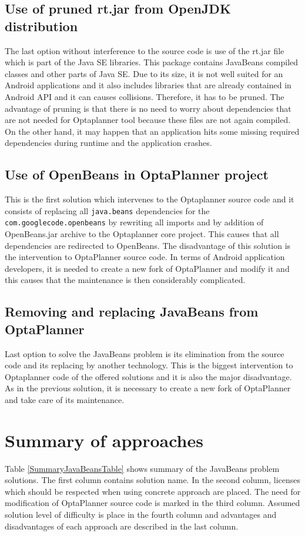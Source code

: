\subsection{Use of pruned rt.jar from OpenJDK distribution}\label{PrunedJarSection}
The last option without interference to the source code is use of the rt.jar file which is part of the Java SE
libraries. This package contains JavaBeans compiled classes and other parts of Java SE. Due to its size, it is not well
suited for an Android applications and it also includes libraries that are already contained in Android API and it can
causes collisions. Therefore, it has to be pruned. The advantage of pruning is that there is no need to worry about
dependencies that are not needed for Optaplanner tool because these files are not again compiled. On the other hand,
it may happen that an application hits some missing required dependencies during runtime and the application crashes.

\subsection{Use of OpenBeans in OptaPlanner project}\label{UseOpenBeansSection}
This is the first solution which intervenes to the Optaplanner source code and it consists of replacing all
\texttt{java.beans} dependencies for the \texttt{com.googlecode.openbeans} by rewriting all imports and by addition of
OpenBeans.jar archive to the Optaplanner core project. This causes that all dependencies are redirected to OpenBeans.
The disadvantage of this solution is the intervention to OptaPlanner source code. In terms of Android application
developers, it is needed to create a new fork of OptaPlanner and modify it and this causes that the maintenance is then
considerably complicated.

\subsection{Removing and replacing JavaBeans from OptaPlanner}\label{RemoveJavaBeansSection}
Last option to solve the JavaBeans problem is its elimination from the source code and its replacing by another
technology. This is the biggest intervention to Optaplanner code of the offered solutions and it is also the major
disadvantage. As in the previous solution, it is necessary to create a new fork of OptaPlanner and take care of its
maintenance.

\section{Summary of approaches}\label{SummarySection}
Table \ref{SummaryJavaBeansTable} shows summary of the JavaBeans problem solutions. The first column contains solution
name. In the second column, licenses which should be respected when using concrete approach are placed. The need for
modification of OptaPlanner source code is marked in the third column. Assumed solution level of difficulty is place in
the fourth column and advantages and disadvantages of each approach are described in the last column.

